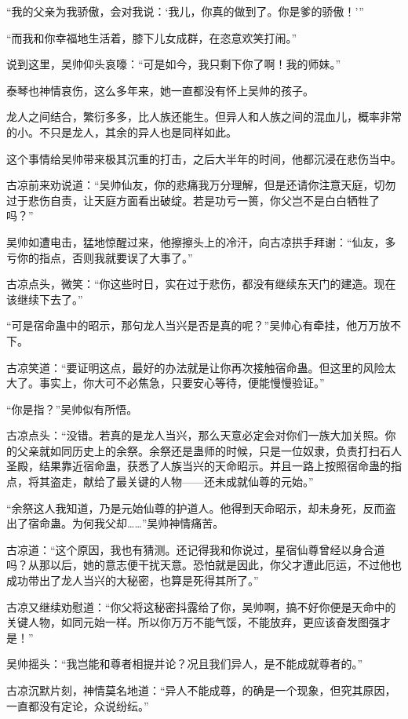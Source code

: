 \begin{this_body}
“我的父亲为我骄傲，会对我说：‘我儿，你真的做到了。你是爹的骄傲！’”

“而我和你幸福地生活着，膝下儿女成群，在恣意欢笑打闹。”

说到这里，吴帅仰头哀嚎：“可是如今，我只剩下你了啊！我的师妹。”

泰琴也神情哀伤，这么多年来，她一直都没有怀上吴帅的孩子。

龙人之间结合，繁衍多多，比人族还能生。但异人和人族之间的混血儿，概率非常的小。不只是龙人，其余的异人也是同样如此。

这个事情给吴帅带来极其沉重的打击，之后大半年的时间，他都沉浸在悲伤当中。

古凉前来劝说道：“吴帅仙友，你的悲痛我万分理解，但是还请你注意天庭，切勿过于悲伤自责，让天庭方面看出破绽。若是功亏一篑，你父岂不是白白牺牲了吗？”

吴帅如遭电击，猛地惊醒过来，他擦擦头上的冷汗，向古凉拱手拜谢：“仙友，多亏你的指点，否则我就要误了大事了。”

古凉点头，微笑：“你这些时日，实在过于悲伤，都没有继续东天门的建造。现在该继续下去了。”

“可是宿命蛊中的昭示，那句龙人当兴是否是真的呢？”吴帅心有牵挂，他万万放不下。

古凉笑道：“要证明这点，最好的办法就是让你再次接触宿命蛊。但这里的风险太大了。事实上，你大可不必焦急，只要安心等待，便能慢慢验证。”

“你是指？”吴帅似有所悟。

古凉点头：“没错。若真的是龙人当兴，那么天意必定会对你们一族大加关照。你的父亲就如同历史上的余祭。余祭还是蛊师的时候，只是一位奴隶，负责打扫石人圣殿，结果靠近宿命蛊，获悉了人族当兴的天命昭示。并且一路上按照宿命蛊的指点，将其盗走，献给了最关键的人物——还未成就仙尊的元始。”

“余祭这人我知道，乃是元始仙尊的护道人。他得到天命昭示，却未身死，反而盗出了宿命蛊。为何我父却……”吴帅神情痛苦。

古凉道：“这个原因，我也有猜测。还记得我和你说过，星宿仙尊曾经以身合道吗？从那以后，她的意志便干扰天意。恐怕就是因此，你父才遭此厄运，不过他也成功带出了龙人当兴的大秘密，也算是死得其所了。”

古凉又继续劝慰道：“你父将这秘密抖露给了你，吴帅啊，搞不好你便是天命中的关键人物，如同元始一样。所以你万万不能气馁，不能放弃，更应该奋发图强才是！”

吴帅摇头：“我岂能和尊者相提并论？况且我们异人，是不能成就尊者的。”

古凉沉默片刻，神情莫名地道：“异人不能成尊，的确是一个现象，但究其原因，一直都没有定论，众说纷纭。”


\end{this_body}

